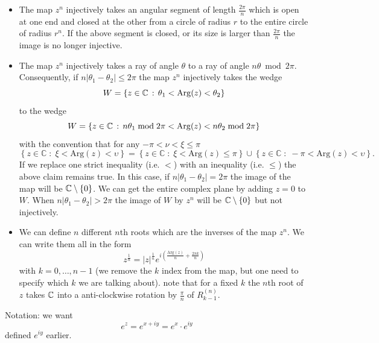 \documentclass[10pt, a4paper]{article}
\begin{document}
\begin{lemma}
    \begin{itemize}
        \item The map $z ^ n$ injectively takes an angular segment of length $\frac{2\pi}{n}$ which is open at one end and closed at the other from a circle of radius $r$ to the entire circle of radius $r ^ n$.
        If the above segment is closed,
        or its size is larger than $\frac{2\pi}{n}$ the image is no longer injective.

        \item The map $z ^ n$ injectively takes a ray of angle $\theta$ to a ray of angle $n\theta\bmod{2\pi}$.
        Consequently,
        if $n|\theta_1 - \theta_2| \leq 2\pi$ the map $z ^ n$ injectively takes the wedge
        \[
        W = \{z \in \mathbb{C}\,:\, \theta_1 < \operatorname{Arg}(z) < \theta_2\}
        \]
        to the wedge
        \[
        W = \{z \in \mathbb{C}\,:\, n\theta_1\bmod{2\pi} < \operatorname{Arg}(z) <n\theta_2\bmod{2\pi}\}
        \]
        with the convention that for any $-\pi < \nu < \xi \leq \pi$
        \[
       \left\{z\in\mathbb{C}\;:\; \xi<\mathrm{Arg}(z)<\upsilon\right\} = \left\{ z\in\mathbb{C}\;:\; \xi<\mathrm{Arg}(z)\leq \pi\right\} \cup \left\{ z\in\mathbb{C}\;:\; -\pi<\mathrm{Arg}(z)<\upsilon\right\}. 
        \]
        If we replace one strict inequality
        (i.e. $<$)
        with an inequality
        (i.e. $\leq$)
        the above claim remains true.
        In this case,
        if $n|\theta_1 - \theta_2| = 2\pi$ the image of the map will be $\mathbb{C} \setminus \{0\}$.
        We can get the entire complex plane by adding $z = 0$ to $W$.
        When $n|\theta_1 - \theta_2| > 2\pi$ the image of $W$ by $z ^ n$ will be $\mathbb{C} \setminus \{0\}$ but not injectively.

        \item We can define $n$ different $n$th roots which are the inverses of the map $z ^ n$.
        We can write them all in the form
        \[
        z^{\frac{1}{n}} = \left\lvert z\right\rvert^{\frac{1}{n}}e^{i\left( \frac{\mathrm{Arg}\left( z\right)}{n} + \frac{2\pi k }{n}\right)}
        \]
        with $k = 0, \dotsc, n - 1$
        (we remove the $k$ index from the map,
        but one need to specify which $k$ we are talking about).
        note that for a fixed $k$ the $n$th root of $z$ takes $\mathbb{C}$ into a anti-clockwise rotation by $\frac{\pi}{n}$ of $R_{k - 1}^{(n)}$.
    \end{itemize}
\end{lemma}

Notation:
we want
\[
e ^ z = e ^ {x + iy} = e ^ x\cdot e ^ {iy}
\]
defined $e ^ {iy}$ earlier.
\end{document}
